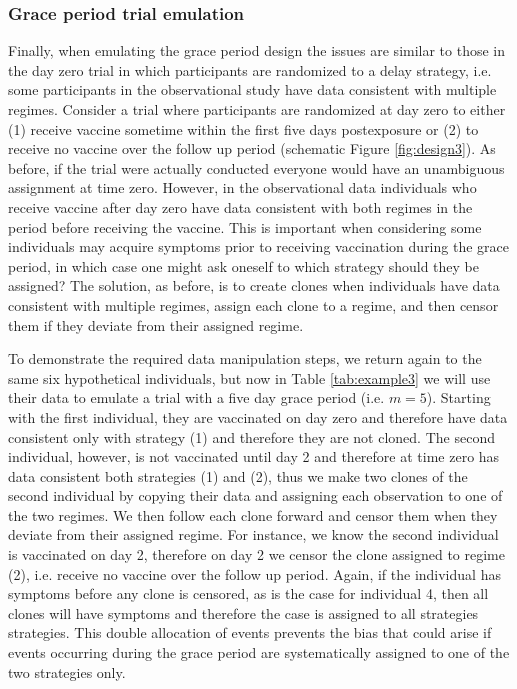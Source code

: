\begin{appendices}
\begin{refsection}
    \subsubsection{Grace period trial emulation}\label{sec:graceperiod_emulation}

    Finally, when emulating the grace period design the issues are similar to those in the day zero trial in which participants are randomized to a delay strategy, i.e. some participants in the observational study have data consistent with multiple regimes. Consider a trial where participants are randomized at day zero to either (1) receive vaccine sometime within the first five days postexposure or (2) to receive no vaccine over the follow up period (schematic Figure \ref{fig:design3}). As before, if the trial were actually conducted everyone would have an unambiguous assignment at time zero. However, in the observational data individuals who receive vaccine after day zero have data consistent with both regimes in the period before receiving the vaccine. This is important when considering some individuals may acquire symptoms prior to receiving vaccination during the grace period, in which case one might ask oneself to which strategy should they be assigned? The solution, as before, is to create clones when individuals have data consistent with multiple regimes, assign each clone to a regime, and then censor them if they deviate from their assigned regime. 

    To demonstrate the required data manipulation steps, we return again to the same six hypothetical individuals, but now in Table \ref{tab:example3} we will use their data to emulate a trial with a five day grace period (i.e. $m = 5$). Starting with the first individual, they are vaccinated on day zero and therefore have data consistent only with strategy (1) and therefore they are not cloned. The second individual, however, is not vaccinated until day 2 and therefore at time zero has data consistent both strategies (1) and (2), thus we make two clones of the second individual by copying their data and assigning each observation to one of the two regimes. We then follow each clone forward and censor them when they deviate from their assigned regime. For instance, we know the second individual is vaccinated on day 2, therefore on day 2 we censor the clone assigned to regime (2), i.e. receive no vaccine over the follow up period. Again, if the individual has symptoms before any clone is censored, as is the case for individual 4, then all clones will have symptoms and therefore the case is assigned to all strategies strategies. This double allocation of events prevents the bias that could arise if events occurring during the grace period are systematically assigned to one of the two strategies only. 


\end{refsection}
\end{appendices}
